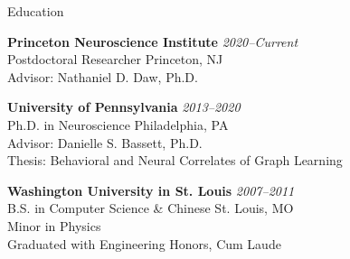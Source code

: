 \documentclass{resume} %
\begin{document}

\begin{rSection}{Education}

\textbf{Princeton Neuroscience Institute} \hfill \emph{2020--Current} \\
Postdoctoral Researcher \hfill Princeton, NJ \\
Advisor: Nathaniel D. Daw, Ph.D.

\textbf{University of Pennsylvania} \hfill \emph{2013--2020} \\
Ph.D. in Neuroscience \hfill Philadelphia, PA \\
Advisor: Danielle S. Bassett, Ph.D. \\
Thesis: Behavioral and Neural Correlates of Graph Learning

\textbf{Washington University in St. Louis} \hfill \emph{2007--2011} \\
B.S. in Computer Science \& Chinese \hfill St. Louis, MO \\
Minor in Physics \\
Graduated with Engineering Honors, Cum Laude

\end{rSection}

\end{document}
